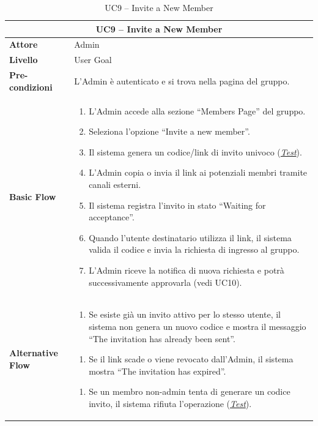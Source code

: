 \begin{table}[htbp]
    \centering
    \footnotesize
    \begin{tabularx}{\textwidth}{|l|X|}
        \hline
        \multicolumn{2}{|c|}{\textbf{UC9 -- Invite a New Member}} \\
        \hline
        \textbf{Attore} & Admin \\
        \hline
        \textbf{Livello} & User Goal \\
        \hline
        \textbf{Pre-condizioni} & L'Admin è autenticato e si trova nella pagina del gruppo. \\
        \hline
        \textbf{Basic Flow} & 
        \begin{enumerate}[leftmargin=*, nosep, topsep=3pt]
            \item L'Admin accede alla sezione ``Members Page'' del gruppo.
            \item Seleziona l'opzione ``Invite a new member''.
            \item Il sistema genera un codice/link di invito univoco (\hyperref[test:uc9_invite]{\textit{Test}}).
            \item L'Admin copia o invia il link ai potenziali membri tramite canali esterni.
            \item Il sistema registra l'invito in stato ``Waiting for acceptance''.
            \item Quando l'utente destinatario utilizza il link, il sistema valida il codice e invia la richiesta di ingresso al gruppo.
            \item L'Admin riceve la notifica di nuova richiesta e potrà successivamente approvarla (vedi UC10).
        \end{enumerate} \\
        \hline
        \textbf{Alternative Flow} & 
        \begin{enumerate}[label=2\alph*., leftmargin=*, nosep, topsep=3pt]
            \item Se esiste già un invito attivo per lo stesso utente, il sistema non genera un nuovo codice e mostra il messaggio ``The invitation has already been sent''.
        \end{enumerate}
        \begin{enumerate}[label=4\alph*., leftmargin=*, nosep, topsep=3pt]
            \item Se il link scade o viene revocato dall'Admin, il sistema mostra ``The invitation has expired''.
        \end{enumerate}
        \begin{enumerate}[label=5\alph*., leftmargin=*, nosep, topsep=3pt]
            \item Se un membro non-admin tenta di generare un codice invito, il sistema rifiuta l'operazione (\hyperref[test:uc9_nonadmin]{\textit{Test}}).
        \end{enumerate} \\
        \hline
    \end{tabularx}
    \caption{UC9 -- Invite a New Member}
    \label{tab:uc9}
\end{table}

